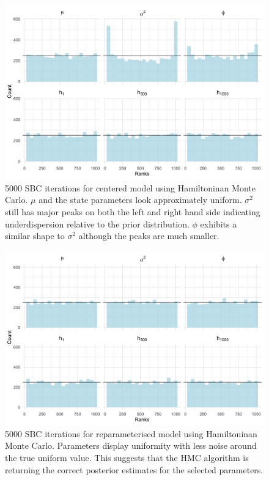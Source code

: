 \documentclass[12pt, a4paper]{article}
\begin{document}
    \begin{figure}[H]
        \centering
        \includegraphics[scale=0.09]{results/hmc_cp_5k.png}
        \caption{5000 SBC iterations for centered model using Hamiltoninan Monte Carlo. $\mu$ and the state parameters look approximately uniform. $\sigma^2$ still has major peaks on both the left and right hand side indicating underdispersion relative to the prior distribution. $\phi$ exhibits a similar shape to $\sigma^2$ although the peaks are much smaller.}
        \label{fig:cphmc5k}
    \end{figure}

    \begin{figure}[H]
        \centering
        \includegraphics[scale=0.09]{results/hmc_ncp_5k.png}
        \caption{5000 SBC iterations for reparameterised model using Hamiltoninan Monte Carlo. Parameters display uniformity with less noise around the true uniform value. This suggests that the HMC algorithm is returning the correct posterior estimates for the selected parameters.}
        \label{fig:ncphmc5k}
    \end{figure}
\end{document}

